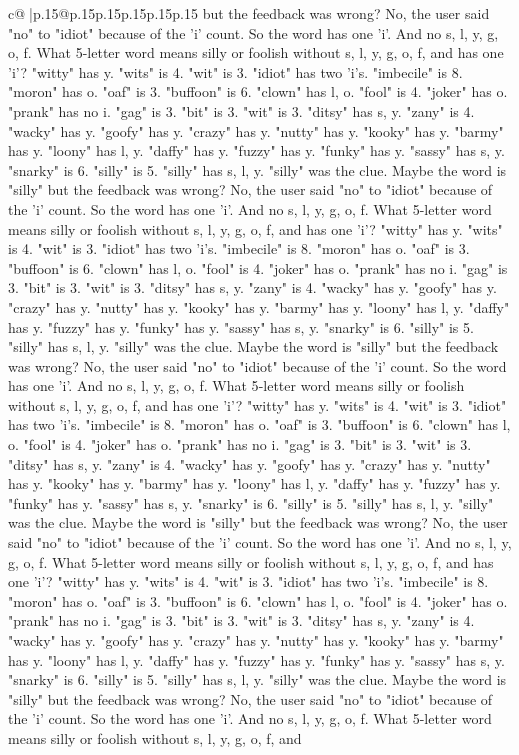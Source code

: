 \documentclass{article}
\begin{document}
{\begin{supertabular}{c@{$\;$}|p{.15\linewidth}@{}p{.15\linewidth}p{.15\linewidth}p{.15\linewidth}p{.15\linewidth}p{.15\linewidth}}
{{{but the feedback was wrong? No, the user said "no" to "idiot" because of the 'i' count. So the word has one 'i'. And no s, l, y, g, o, f. What 5{-}letter word means silly or foolish without s, l, y, g, o, f, and has one 'i'? "witty" has y. "wits" is 4. "wit" is 3. "idiot" has two 'i's. "imbecile" is 8. "moron" has o. "oaf" is 3. "buffoon" is 6. "clown" has l, o. "fool" is 4. "joker" has o. "prank" has no i. "gag" is 3. "bit" is 3. "wit" is 3. "ditsy" has s, y. "zany" is 4. "wacky" has y. "goofy" has y. "crazy" has y. "nutty" has y. "kooky" has y. "barmy" has y. "loony" has l, y. "daffy" has y. "fuzzy" has y. "funky" has y. "sassy" has s, y. "snarky" is 6. "silly" is 5. "silly" has s, l, y. "silly" was the clue. Maybe the word is "silly" but the feedback was wrong? No, the user said "no" to "idiot" because of the 'i' count. So the word has one 'i'. And no s, l, y, g, o, f. What 5{-}letter word means silly or foolish without s, l, y, g, o, f, and has one 'i'? "witty" has y. "wits" is 4. "wit" is 3. "idiot" has two 'i's. "imbecile" is 8. "moron" has o. "oaf" is 3. "buffoon" is 6. "clown" has l, o. "fool" is 4. "joker" has o. "prank" has no i. "gag" is 3. "bit" is 3. "wit" is 3. "ditsy" has s, y. "zany" is 4. "wacky" has y. "goofy" has y. "crazy" has y. "nutty" has y. "kooky" has y. "barmy" has y. "loony" has l, y. "daffy" has y. "fuzzy" has y. "funky" has y. "sassy" has s, y. "snarky" is 6. "silly" is 5. "silly" has s, l, y. "silly" was the clue. Maybe the word is "silly" but the feedback was wrong? No, the user said "no" to "idiot" because of the 'i' count. So the word has one 'i'. And no s, l, y, g, o, f. What 5{-}letter word means silly or foolish without s, l, y, g, o, f, and has one 'i'? "witty" has y. "wits" is 4. "wit" is 3. "idiot" has two 'i's. "imbecile" is 8. "moron" has o. "oaf" is 3. "buffoon" is 6. "clown" has l, o. "fool" is 4. "joker" has o. "prank" has no i. "gag" is 3. "bit" is 3. "wit" is 3. "ditsy" has s, y. "zany" is 4. "wacky" has y. "goofy" has y. "crazy" has y. "nutty" has y. "kooky" has y. "barmy" has y. "loony" has l, y. "daffy" has y. "fuzzy" has y. "funky" has y. "sassy" has s, y. "snarky" is 6. "silly" is 5. "silly" has s, l, y. "silly" was the clue. Maybe the word is "silly" but the feedback was wrong? No, the user said "no" to "idiot" because of the 'i' count. So the word has one 'i'. And no s, l, y, g, o, f. What 5{-}letter word means silly or foolish without s, l, y, g, o, f, and has one 'i'? "witty" has y. "wits" is 4. "wit" is 3. "idiot" has two 'i's. "imbecile" is 8. "moron" has o. "oaf" is 3. "buffoon" is 6. "clown" has l, o. "fool" is 4. "joker" has o. "prank" has no i. "gag" is 3. "bit" is 3. "wit" is 3. "ditsy" has s, y. "zany" is 4. "wacky" has y. "goofy" has y. "crazy" has y. "nutty" has y. "kooky" has y. "barmy" has y. "loony" has l, y. "daffy" has y. "fuzzy" has y. "funky" has y. "sassy" has s, y. "snarky" is 6. "silly" is 5. "silly" has s, l, y. "silly" was the clue. Maybe the word is "silly" but the feedback was wrong? No, the user said "no" to "idiot" because of the 'i' count. So the word has one 'i'. And no s, l, y, g, o, f. What 5{-}letter word means silly or foolish without s, l, y, g, o, f, and }}}
\end{supertabular}}
\end{document}
